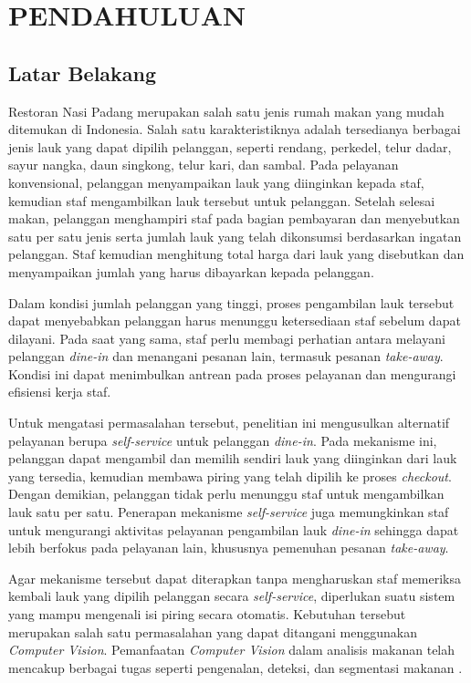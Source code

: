 \chapter{PENDAHULUAN}

\section{Latar Belakang}

Restoran Nasi Padang merupakan salah satu jenis rumah makan yang mudah ditemukan di Indonesia. Salah satu karakteristiknya adalah tersedianya berbagai jenis lauk yang dapat dipilih pelanggan, seperti rendang, perkedel, telur dadar, sayur nangka, daun singkong, telur kari, dan sambal. Pada pelayanan konvensional, pelanggan menyampaikan lauk yang diinginkan kepada staf, kemudian staf mengambilkan lauk tersebut untuk pelanggan. Setelah selesai makan, pelanggan menghampiri staf pada bagian pembayaran dan menyebutkan satu per satu jenis serta jumlah lauk yang telah dikonsumsi berdasarkan ingatan pelanggan. Staf kemudian menghitung total harga dari lauk yang disebutkan dan menyampaikan jumlah yang harus dibayarkan kepada pelanggan.

Dalam kondisi jumlah pelanggan yang tinggi, proses pengambilan lauk tersebut dapat menyebabkan pelanggan harus menunggu ketersediaan staf sebelum dapat dilayani. Pada saat yang sama, staf perlu membagi perhatian antara melayani pelanggan \textit{dine-in} dan menangani pesanan lain, termasuk pesanan \textit{take-away}. Kondisi ini dapat menimbulkan antrean pada proses pelayanan dan mengurangi efisiensi kerja staf.

Untuk mengatasi permasalahan tersebut, penelitian ini mengusulkan alternatif pelayanan berupa \textit{self-service} untuk pelanggan \textit{dine-in}. Pada mekanisme ini, pelanggan dapat mengambil dan memilih sendiri lauk yang diinginkan dari lauk yang tersedia, kemudian membawa piring yang telah dipilih ke proses \textit{checkout}. Dengan demikian, pelanggan tidak perlu menunggu staf untuk mengambilkan lauk satu per satu. Penerapan mekanisme \textit{self-service} juga memungkinkan staf untuk mengurangi aktivitas pelayanan pengambilan lauk \textit{dine-in} sehingga dapat lebih berfokus pada pelayanan lain, khususnya pemenuhan pesanan \textit{take-away}.

Agar mekanisme tersebut dapat diterapkan tanpa mengharuskan staf memeriksa
kembali lauk yang dipilih pelanggan secara \textit{self-service}, diperlukan
suatu sistem yang mampu mengenali isi piring secara otomatis. Kebutuhan
tersebut merupakan salah satu permasalahan yang dapat ditangani menggunakan
\textit{Computer Vision}. Pemanfaatan \textit{Computer Vision} dalam analisis
makanan telah mencakup berbagai tugas seperti pengenalan, deteksi, dan
segmentasi makanan \cite{min2019}.

